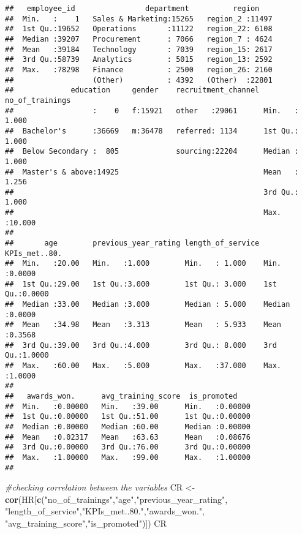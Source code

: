 \documentclass[
]{article}
\newenvironment{Shaded}{\begin{snugshade}}{\end{snugshade}}
\newcommand{\CommentTok}[1]{\textcolor[rgb]{0.56,0.35,0.01}{\textit{#1}}}
\newcommand{\KeywordTok}[1]{\textcolor[rgb]{0.13,0.29,0.53}{\textbf{#1}}}
\newcommand{\NormalTok}[1]{#1}
\newcommand{\StringTok}[1]{\textcolor[rgb]{0.31,0.60,0.02}{#1}}
\begin{document}
\begin{verbatim}
##   employee_id                department          region     
##  Min.   :    1   Sales & Marketing:15265   region_2 :11497  
##  1st Qu.:19652   Operations       :11122   region_22: 6108  
##  Median :39207   Procurement      : 7066   region_7 : 4624  
##  Mean   :39184   Technology       : 7039   region_15: 2617  
##  3rd Qu.:58739   Analytics        : 5015   region_13: 2592  
##  Max.   :78298   Finance          : 2500   region_26: 2160  
##                  (Other)          : 4392   (Other)  :22801  
##             education     gender    recruitment_channel no_of_trainings 
##                  :    0   f:15921   other   :29061      Min.   : 1.000  
##  Bachelor's      :36669   m:36478   referred: 1134      1st Qu.: 1.000  
##  Below Secondary :  805             sourcing:22204      Median : 1.000  
##  Master's & above:14925                                 Mean   : 1.256  
##                                                         3rd Qu.: 1.000  
##                                                         Max.   :10.000  
##                                                                         
##       age        previous_year_rating length_of_service KPIs_met..80.   
##  Min.   :20.00   Min.   :1.000        Min.   : 1.000    Min.   :0.0000  
##  1st Qu.:29.00   1st Qu.:3.000        1st Qu.: 3.000    1st Qu.:0.0000  
##  Median :33.00   Median :3.000        Median : 5.000    Median :0.0000  
##  Mean   :34.98   Mean   :3.313        Mean   : 5.933    Mean   :0.3568  
##  3rd Qu.:39.00   3rd Qu.:4.000        3rd Qu.: 8.000    3rd Qu.:1.0000  
##  Max.   :60.00   Max.   :5.000        Max.   :37.000    Max.   :1.0000  
##                                                                         
##   awards_won.      avg_training_score  is_promoted     
##  Min.   :0.00000   Min.   :39.00      Min.   :0.00000  
##  1st Qu.:0.00000   1st Qu.:51.00      1st Qu.:0.00000  
##  Median :0.00000   Median :60.00      Median :0.00000  
##  Mean   :0.02317   Mean   :63.63      Mean   :0.08676  
##  3rd Qu.:0.00000   3rd Qu.:76.00      3rd Qu.:0.00000  
##  Max.   :1.00000   Max.   :99.00      Max.   :1.00000  
## 
\end{verbatim}

\begin{Shaded}
\begin{Highlighting}[]
\CommentTok{#checking correlation between the variables }
\NormalTok{CR <-}\StringTok{ }\KeywordTok{cor}\NormalTok{(HR[}\KeywordTok{c}\NormalTok{(}\StringTok{"no_of_trainings"}\NormalTok{,}\StringTok{"age"}\NormalTok{,}\StringTok{"previous_year_rating"}\NormalTok{,}
               \StringTok{"length_of_service"}\NormalTok{,}\StringTok{"KPIs_met..80."}\NormalTok{,}\StringTok{"awards_won."}\NormalTok{,}
               \StringTok{"avg_training_score"}\NormalTok{,}\StringTok{"is_promoted"}\NormalTok{)])}
\NormalTok{CR}
\end{Highlighting}
\end{Shaded}
\end{document}
